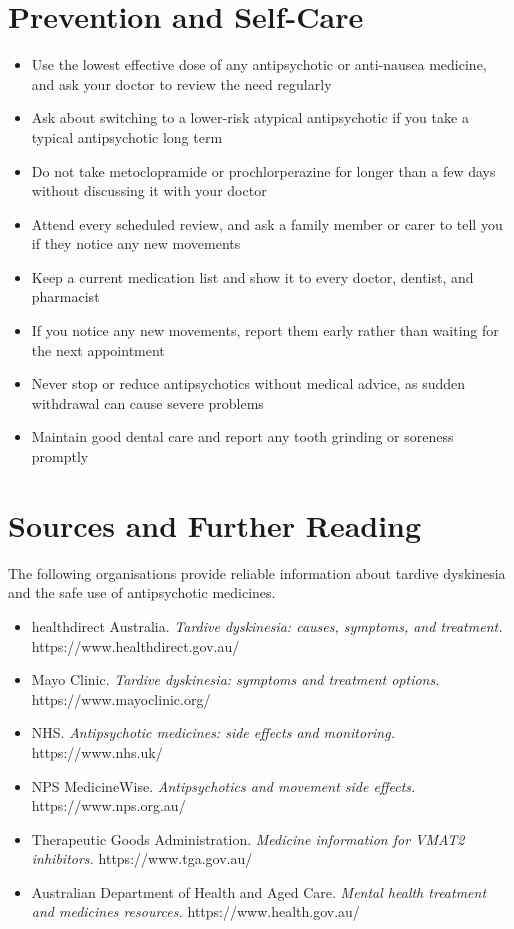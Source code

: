 \section*{Prevention and Self-Care}
\begin{itemize}
    \item Use the lowest effective dose of any antipsychotic or anti-nausea medicine, and ask your doctor to review the need regularly
    \item Ask about switching to a lower-risk atypical antipsychotic if you take a typical antipsychotic long term
    \item Do not take metoclopramide or prochlorperazine for longer than a few days without discussing it with your doctor
    \item Attend every scheduled review, and ask a family member or carer to tell you if they notice any new movements
    \item Keep a current medication list and show it to every doctor, dentist, and pharmacist
    \item If you notice any new movements, report them early rather than waiting for the next appointment
    \item Never stop or reduce antipsychotics without medical advice, as sudden withdrawal can cause severe problems
    \item Maintain good dental care and report any tooth grinding or soreness promptly
\end{itemize}

\section*{Sources and Further Reading}
The following organisations provide reliable information about tardive dyskinesia and the safe use of antipsychotic medicines.

\begin{itemize}
    \item healthdirect Australia. \textit{Tardive dyskinesia: causes, symptoms, and treatment.} https://www.healthdirect.gov.au/
    \item Mayo Clinic. \textit{Tardive dyskinesia: symptoms and treatment options.} https://www.mayoclinic.org/
    \item NHS. \textit{Antipsychotic medicines: side effects and monitoring.} https://www.nhs.uk/
    \item NPS MedicineWise. \textit{Antipsychotics and movement side effects.} https://www.nps.org.au/
    \item Therapeutic Goods Administration. \textit{Medicine information for VMAT2 inhibitors.} https://www.tga.gov.au/
    \item Australian Department of Health and Aged Care. \textit{Mental health treatment and medicines resources.} https://www.health.gov.au/
\end{itemize}

\clearpage
